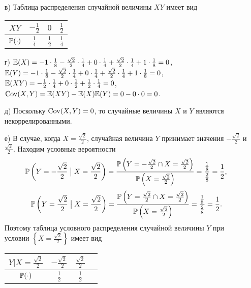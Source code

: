 \begin{enumerate}
\begin{enumerate}
\item[в)] Таблица распределения случайной величины $XY$ имеет вид
\begin{center}
\begin{tabular}{@{}cccc@{}}
\toprule
$XY$         & $-\frac{1}{2}$  & $0$ & $ \frac{1}{2}$ \\ \midrule
$\P(\cdot)$ & $\frac{1}{4}$ & $\frac{1}{2}$ & $\frac{1}{4}$ \\ \bottomrule
\end{tabular}
\end{center}


\item[г)] $\E(X) = -1 \cdot \frac{1}{8} - \frac{\sqrt{2}}{2} \cdot \frac{1}{4} + 0 \cdot \frac{1}{4} + \frac{\sqrt{2}}{2} \cdot \frac{1}{4} + 1 \cdot \frac{1}{8} = 0$,
$\E(Y) = -1 \cdot \frac{1}{8} - \frac{\sqrt{2}}{2} \cdot \frac{1}{4} + 0 \cdot \frac{1}{4} + \frac{\sqrt{2}}{2} \cdot \frac{1}{4} + 1 \cdot \frac{1}{8} = 0$,
$\E(XY) = -\frac{1}{2} \cdot \frac{1}{4} + 0 \cdot \frac{1}{2} + \frac{1}{2} \cdot \frac{1}{4} = 0$,
$\Cov(X,Y) = \E(XY) - \E(X)\E(Y) = 0 - 0 \cdot 0 = 0$.

\item[д)] Поскольку $\Cov(X,Y) = 0$, то случайные величины $X$ и $Y$ являются некоррелированными.

\item[е)] В случае, когда $X = \frac{\sqrt{2}}{2}$, случайная величина $Y$ принимает значения $-\frac{\sqrt{2}}{2}$ и $\frac{\sqrt{2}}{2}$. Находим условные вероятности
\[
\P\left(Y=-\frac{\sqrt{2}}{2} \bigm| X = \frac{\sqrt{2}}{2}\right) =
\frac{\P\left(Y=-\frac{\sqrt{2}}{2} \cap X = \frac{\sqrt{2}}{2}\right)}{\P\left(X = \frac{\sqrt{2}}{2}\right)} = \frac{\frac{1}{8}}{\frac{2}{8}} = \frac{1}{2} \text{,}
\]
\[
\P\left(Y=\frac{\sqrt{2}}{2} \bigm| X = \frac{\sqrt{2}}{2}\right) =
\frac{\P\left(Y=\frac{\sqrt{2}}{2} \cap X = \frac{\sqrt{2}}{2}\right)}{\P\left(X = \frac{\sqrt{2}}{2}\right)} = \frac{\frac{1}{8}}{\frac{2}{8}} = \frac{1}{2} \text{.}
\]
Поэтому таблица условного распределения случайной величины $Y$ при условии $\left\{X = \frac{\sqrt{2}}{2}\right\}$ имеет вид
\begin{center}
\begin{tabular}{@{}cccc@{}}
\toprule
$Y | X = \frac{\sqrt{2}}{2}$         & $-\frac{\sqrt{2}}{2}$   & $\frac{\sqrt{2}}{2}$  \\ \midrule
$\P(\cdot)$ &  $\frac{1}{2}$ & $\frac{1}{2}$ \\ \bottomrule
\end{tabular}
\end{center}


\end{enumerate}
\end{enumerate}
